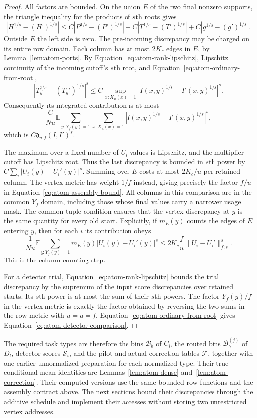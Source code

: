 \begin{proof}
All factors are bounded.  On the union $E$ of the two final nonzero
supports, the triangle inequality for the products of $s$th roots gives
\[
 |H^{1/s}-(H')^{1/s}|
 \le C|P^{1/s}-(P')^{1/s}|
     +C|T^{1/s}-(T')^{1/s}|
     +C|g^{1/s}-(g')^{1/s}|.
\]
Outside $E$ the left side is zero.  The pre-incoming discrepancy may be
charged on its entire row domain.  Each column
has at most $2K_c$ edges in $E$, by Lemma~\ref{lem:atom-ports}.
By Equation~\eqref{eq:atom-rank-lipschitz}, Lipschitz continuity of the incoming
cutoff's $s$th root, and Equation~\eqref{eq:atom-ordinary-from-root},
\[
 |T_y^{1/s}-(T_y')^{1/s}|^s
 \le C\sup_{x:X_u(x)=1}
            |I(x,y)^{1/s}-I'(x,y)^{1/s}|^s.
\]
Consequently its integrated contribution is at most
\[
 \frac C{Nu}\mathbb E\sum_{y:Y_f(y)=1}
              \sum_{x:X_u(x)=1}
              |I(x,y)^{1/s}-I'(x,y)^{1/s}|^s,
\]
which is $C\mathfrak d_{u,f}(I,I')^s$.

The maximum over a fixed number of $U_i$ values is Lipschitz, and the
multiplier cutoff has Lipschitz root.  Thus the last discrepancy is
bounded in $s$th power by $C\sum_i|U_i(y)-U_i'(y)|^s$.
Summing over $E$ costs at most $2K_c/u$ per retained column.  The vertex
metric has weight $1/f$ instead, giving precisely the factor $f/u$ in
Equation~\eqref{eq:atom-assembly-bound}.  All columns in this comparison
are in the common $Y_f$ domain, including those whose final values carry
a narrower usage mask.  The common-tuple condition ensures that the
vertex discrepancy at $y$ is the same quantity for every old start.
Explicitly, if $m_E(y)$ counts the edges of $E$ entering $y$, then for
each $i$ its contribution obeys
\[
 \frac1{Nu}\mathbb E\sum_{y:Y_f(y)=1}
       m_E(y)|U_i(y)-U_i'(y)|^s
 \le 2K_c\frac fu\|U_i-U_i'\|_{f;s}^s.
\]
This is the column-counting step.

For a detector trial, Equation~\eqref{eq:atom-rank-lipschitz} bounds the
trial discrepancy by the supremum of the input score discrepancies over
retained starts.  Its $s$th power is at most the sum of their $s$th powers.
The factor $Y_f(y)/f$ in the vertex metric is exactly the factor obtained
by reversing the two sums in the row metric with $u=a=f$.
Equation~\eqref{eq:atom-ordinary-from-root} gives
Equation~\eqref{eq:atom-detector-comparison}.
\end{proof}

The required task types are therefore the bins $\mathcal B_b$ of
$C_l$, the routed bins $\mathcal B_b^{(j)}$ of $D_l$, detector scores
$\mathcal S_i$, and the pilot and actual correction tables $\mathcal F$,
together with one earlier unnormalized preparation for each normalized
type.  Their true conditional-mean identities are
Lemmas~\ref{lem:atom-dense} and~\ref{lem:atom-correction}.  Their computed
versions use the same bounded row functions and the assembly contract
above.  The next sections bound their discrepancies through the
additive schedule and implement their accesses without storing two
unrestricted vertex addresses.
